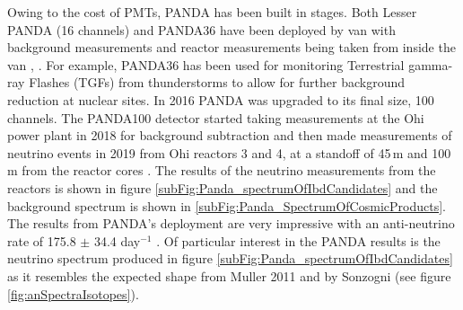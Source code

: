 Owing to the cost of PMTs, PANDA has been built in stages.  Both Lesser PANDA (16 channels) and PANDA36 have been deployed by van with background measurements and reactor measurements being taken from inside the van \cite{PANDA_2012}, \cite{PANDA_2014}. For example, PANDA36 has been used for monitoring Terrestrial gamma-ray Flashes (TGFs) from thunderstorms to allow for further background reduction at nuclear sites\cite{PANDA_tgf}. In 2016 PANDA was upgraded to its final size, 100 channels. The PANDA100 detector started taking measurements at the Ohi power plant in 2018 for background subtraction and then made measurements of neutrino events in 2019 from Ohi reactors 3 and 4, at a standoff of 45\,m and 100\,m from the reactor cores \cite{Iwata_2019}. The results of the neutrino measurements from the reactors is shown in figure \ref{subFig:Panda_spectrumOfIbdCandidates} and the background spectrum is shown in \ref{subFig:Panda_SpectrumOfCosmicProducts}. The results from PANDA's deployment are very impressive with an anti-neutrino rate of 175.8 $\pm$ 34.4 day$^{-1}$ \cite{IIRIE_Panda_2021}. Of particular interest in the PANDA results is the neutrino spectrum produced in figure \ref{subFig:Panda_spectrumOfIbdCandidates} as it resembles the expected shape from Muller 2011 \cite{Mueller_2011} and by Sonzogni \cite{sonzogni_nucStrcutre_2015} (see figure \ref{fig:anSpectraIsotopes}).

